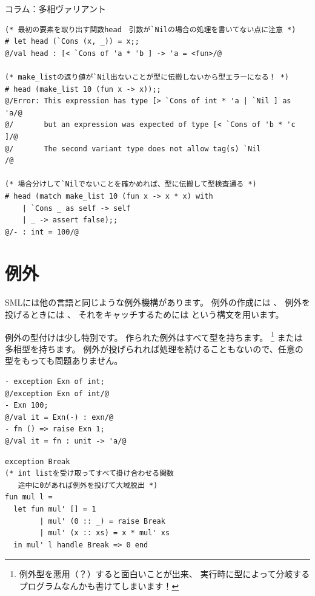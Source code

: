 \documentclass[11pt,a4paper]{jarticle}
\begin{document}
\begin{itembox}[l]{コラム：多相ヴァリアント}
\begin{lstlisting}[caption=多相ヴァリアントを用いたリスト構造(ocamlコード)]
(* 最初の要素を取り出す関数head　引数が`Nilの場合の処理を書いてない点に注意 *)
# let head (`Cons (x, _)) = x;;
@/val head : [< `Cons of 'a * 'b ] -> 'a = <fun>/@

(* make_listの返り値が`Nil出ないことが型に伝搬しないから型エラーになる！ *)
# head (make_list 10 (fun x -> x));;
@/Error: This expression has type [> `Cons of int * 'a | `Nil ] as 'a/@
@/       but an expression was expected of type [< `Cons of 'b * 'c ]/@
@/       The second variant type does not allow tag(s) `Nil          /@

(* 場合分けして`Nilでないことを確かめれば、型に伝搬して型検査通る *)
# head (match make_list 10 (fun x -> x * x) with
    | `Cons _ as self -> self
    | _ -> assert false);;
@/- : int = 100/@
\end{lstlisting}

\end{itembox}

\section{例外}

SMLには他の言語と同じような例外機構があります。
例外の作成には 、
例外を投げるときには 、
それをキャッチするためには
という構文を用います。

例外の型付けは少し特別です。
作られた例外はすべて型を持ちます。
\footnote{例外型を悪用（？）すると面白いことが出来、
実行時に型によって分岐するプログラムなんかも書けてしまいます\cite{use-exn}！}
または多相型を持ちます。
例外が投げられれば処理を続けることもないので、任意の型をもっても問題ありません。

\begin{minipage}[htb]{0.4\linewidth}
\begin{lstlisting}[caption=例外の型付け]
- exception Exn of int;
@/exception Exn of int/@
- Exn 100;
@/val it = Exn(-) : exn/@
- fn () => raise Exn 1;
@/val it = fn : unit -> 'a/@
\end{lstlisting}
\end{minipage}
\hfill
\begin{minipage}[htb]{0.6\linewidth}
\begin{lstlisting}[caption=例外を用いたプログラム例]
exception Break
(* int listを受け取ってすべて掛け合わせる関数　
   途中に0があれば例外を投げて大域脱出 *)
fun mul l =
  let fun mul' [] = 1
        | mul' (0 :: _) = raise Break
        | mul' (x :: xs) = x * mul' xs
  in mul' l handle Break => 0 end
\end{lstlisting}
\end{minipage}
\end{document}
